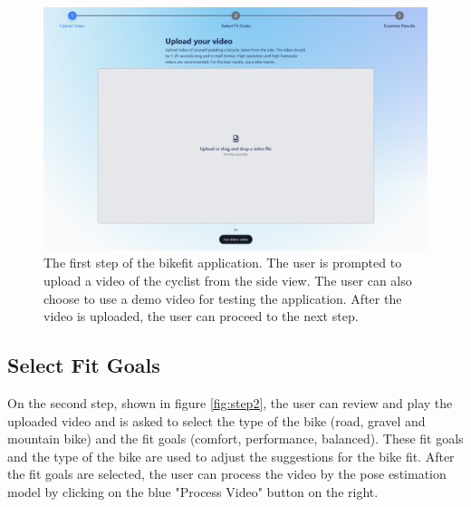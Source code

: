 \begin{figure}[htbp]
    \centering
    \includegraphics[width=\textwidth]{obrazky-figures/step1-crop.png}
    \caption{The first step of the bikefit application. The user is prompted to upload a video of the cyclist from the side view. The user can also choose to use a demo video for testing the application. After the video is uploaded, the user can proceed to the next step.}
    \label{fig:step1}
\end{figure}

\subsection{Select Fit Goals}

On the second step, shown in figure \ref{fig:step2}, the user can review and play the uploaded video and is asked to select the type of the bike (road, gravel and mountain bike) and the fit goals (comfort, performance, balanced). These fit goals and the type of the bike are used to adjust the suggestions for the bike fit. After the fit goals are selected, the user can process the video by the pose estimation model by clicking on the blue "Process Video" button on the right.

